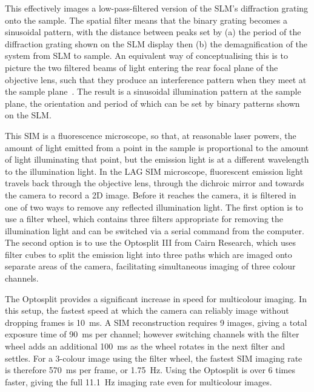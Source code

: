This effectively images a low-pass-filtered version of the SLM's diffraction grating onto the sample. 
The spatial filter means that the binary grating becomes a sinusoidal pattern, with the distance between peaks set by (a) the period of the diffraction grating shown on the SLM display then (b) the demagnification of the system from SLM to sample. 
An equivalent way of conceptualising this is to picture the two filtered beams of light entering the rear focal plane of the objective lens, such that they produce an interference pattern when they meet at the sample plane~\cite[\textit{ch. 9}]{hecht2017optics}. 
The result is a sinusoidal illumination pattern at the sample plane, the orientation and period of which can be set by binary patterns shown on the SLM. 

This SIM is a fluorescence microscope, so that, at reasonable laser powers, the amount of light emitted from a point in the sample is proportional to the amount of light illuminating that point, but the emission light is at a different wavelength to the illumination light. 
In the LAG SIM microscope, fluorescent emission light travels back through the objective lens, through the dichroic mirror and towards the camera to record a 2D image. 
Before it reaches the camera, it is filtered in one of two ways to remove any reflected illumination light.
The first option is to use a filter wheel, which contains three filters appropriate for removing the illumination light and can be switched via a serial command from the computer. 
The second option is to use the Optosplit III from Cairn Research, which uses filter cubes to split the emission light into three paths which are imaged onto separate areas of the camera, facilitating simultaneous imaging of three colour channels.

The Optosplit provides a significant increase in speed for multicolour imaging. 
In this setup, the fastest speed at which the camera can reliably image without dropping frames is \SI{10}{\milli\second}. 
A SIM reconstruction requires 9 images, giving a total exposure time of \SI{90}{\milli\second} per channel; however switching channels with the filter wheel adds an additional \SI{100}{\milli\second} as the wheel rotates in the next filter and settles. 
For a 3-colour image using the filter wheel, the fastest SIM imaging rate is therefore \SI{570}{\milli\second} per frame, or \SI{1.75}{\hertz}. 
Using the Optosplit is over 6 times faster, giving the full \SI{11.1}{\hertz} imaging rate even for multicolour images.

